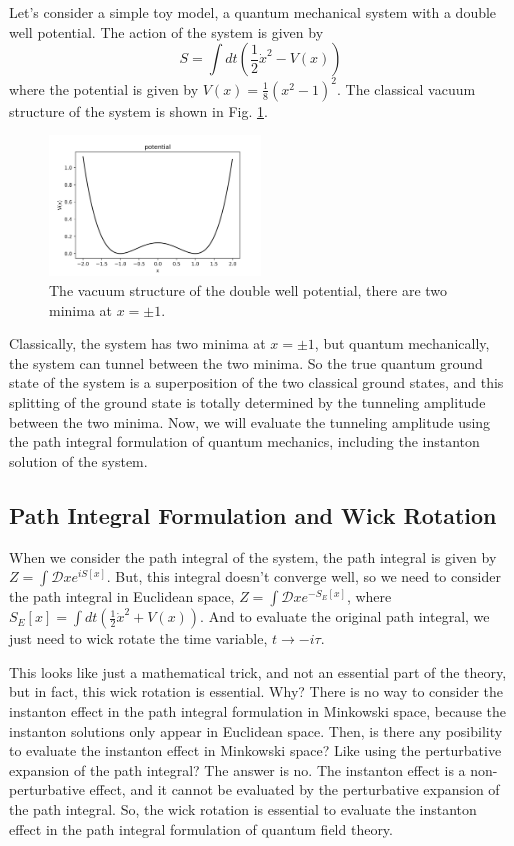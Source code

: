 \documentclass{article}
\begin{document}
Let's consider a simple toy model, a quantum mechanical system with a double well potential. The action of the system is given by
\begin{equation}
    S = \int dt \left( \frac{1}{2} \dot{x}^2 - V(x) \right)
\end{equation}
where the potential is given by $V(x) = \frac{1}{8}(x^2-1)^2$.
The classical vacuum structure of the system is shown in Fig. \ref{fig:doublewell}.
\begin{figure}[h]
    \centering
    \includegraphics[width=0.5\textwidth]{potential.png}
    \caption{The vacuum structure of the double well potential, there are two minima at $x = \pm 1$.}
    \label{fig:doublewell}
\end{figure}

Classically, the system has two minima at $x = \pm 1$, but quantum mechanically, the system can tunnel between the two minima.
So the true quantum ground state of the system is a superposition of the two classical ground states, and this splitting of the ground state is totally determined by the tunneling amplitude between the two minima.
Now, we will evaluate the tunneling amplitude using the path integral formulation of quantum mechanics, including the instanton solution of the system. 




\subsection{Path Integral Formulation and Wick Rotation}


When we consider the path integral of the system, the path integral is given by $Z = \int \mathcal{D}x e^{iS[x]}$.
But, this integral doesn't converge well, so we need to consider the path integral in Euclidean space, $Z = \int \mathcal{D}x e^{-S_E[x]}$, where $S_E[x] = \int dt \left( \frac{1}{2} \dot{x}^2 + V(x) \right)$.
And to evaluate the original path integral, we just need to wick rotate the time variable, $t \rightarrow -i\tau$.

This looks like just a mathematical trick, and not an essential part of the theory, but in fact, this wick rotation is essential.
Why? There is no way to consider the instanton effect in the path integral formulation in Minkowski space, because the instanton solutions only appear in Euclidean space.
Then, is there any posibility to evaluate the instanton effect in Minkowski space? Like using the perturbative expansion of the path integral? The answer is no. The instanton effect is a non-perturbative effect, and it cannot be evaluated by the perturbative expansion of the path integral.
So, the wick rotation is essential to evaluate the instanton effect in the path integral formulation of quantum field theory.
\end{document}
